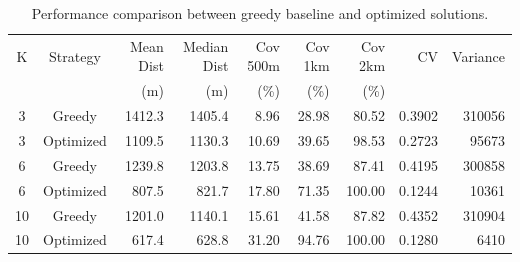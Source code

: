\begin{table}[htbp]
\centering
\caption{Performance comparison between greedy baseline and optimized solutions.}
\label{tab:performance_summary}
\begin{tabular}{ccrrrrrrr}
\toprule
K & Strategy & Mean Dist & Median Dist & Cov 500m & Cov 1km & Cov 2km & CV & Variance \\
  &          & (m)       & (m)         & (\%)     & (\%)    & (\%)    &    &          \\
\midrule
3 & Greedy & 1412.3 & 1405.4 & 8.96 & 28.98 & 80.52 & 0.3902 & 310056 \\
3 & Optimized & 1109.5 & 1130.3 & 10.69 & 39.65 & 98.53 & 0.2723 & 95673 \\
\midrule
6 & Greedy & 1239.8 & 1203.8 & 13.75 & 38.69 & 87.41 & 0.4195 & 300858 \\
6 & Optimized & 807.5 & 821.7 & 17.80 & 71.35 & 100.00 & 0.1244 & 10361 \\
\midrule
10 & Greedy & 1201.0 & 1140.1 & 15.61 & 41.58 & 87.82 & 0.4352 & 310904 \\
10 & Optimized & 617.4 & 628.8 & 31.20 & 94.76 & 100.00 & 0.1280 & 6410 \\
\midrule
\bottomrule
\end{tabular}
\end{table}